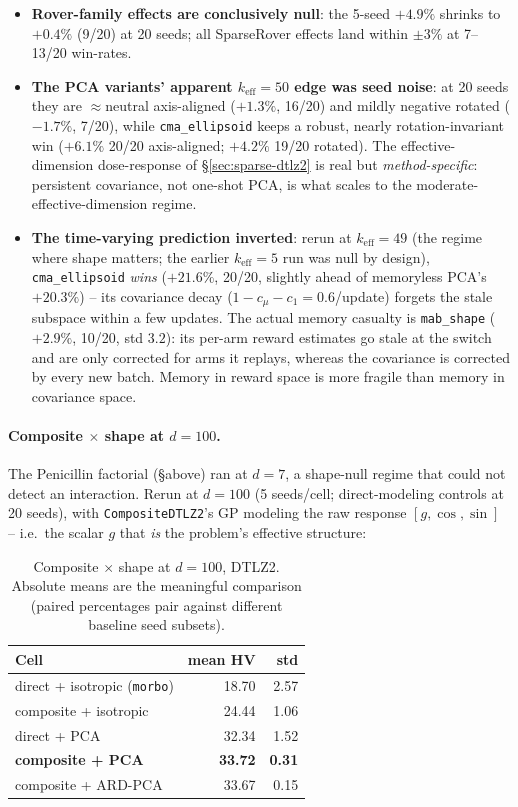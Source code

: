 \documentclass[11pt]{article}
\begin{document}
\begin{itemize}
\item \textbf{Rover-family effects are conclusively null}: the 5-seed
$+4.9\%$ shrinks to $+0.4\%$ (9/20) at 20 seeds; all SparseRover effects
land within $\pm 3\%$ at 7--13/20 win-rates.
\item \textbf{The PCA variants' apparent $k_{\mathrm{eff}}{=}50$ edge was
seed noise}: at 20 seeds they are $\approx$neutral axis-aligned ($+1.3\%$,
16/20) and mildly negative rotated ($-1.7\%$, 7/20), while
\texttt{cma\_ellipsoid} keeps a robust, nearly rotation-invariant win
($+6.1\%$ 20/20 axis-aligned; $+4.2\%$ 19/20 rotated). The
effective-dimension dose-response of \S\ref{sec:sparse-dtlz2} is real but
\emph{method-specific}: persistent covariance, not one-shot PCA, is what
scales to the moderate-effective-dimension regime.
\item \textbf{The time-varying prediction inverted}: rerun at
$k_{\mathrm{eff}}{=}49$ (the regime where shape matters; the earlier
$k_{\mathrm{eff}}{=}5$ run was null by design), \texttt{cma\_ellipsoid}
\emph{wins} ($+21.6\%$, 20/20, slightly ahead of memoryless PCA's
$+20.3\%$) -- its covariance decay ($1{-}c_\mu{-}c_1 = 0.6$/update)
forgets the stale subspace within a few updates. The actual memory
casualty is \texttt{mab\_shape} ($+2.9\%$, 10/20, std $3.2$): its per-arm
reward estimates go stale at the switch and are only corrected for arms it
replays, whereas the covariance is corrected by every new batch. Memory in
reward space is more fragile than memory in covariance space.
\end{itemize}

\paragraph{Composite $\times$ shape at $d{=}100$.} The Penicillin
factorial (\S above) ran at $d{=}7$, a shape-null regime that could not
detect an interaction. Rerun at $d{=}100$ (5 seeds/cell; direct-modeling
controls at 20 seeds), with \texttt{CompositeDTLZ2}'s GP modeling the raw
response $[g, \cos, \sin]$ -- i.e.\ the scalar $g$ that \emph{is} the
problem's effective structure:

\begin{table}[h]
\centering
\caption{Composite $\times$ shape at $d{=}100$, DTLZ2. Absolute means are
the meaningful comparison (paired percentages pair against different
baseline seed subsets).}
\label{tab:composite-shape-100d}
\begin{tabular}{lrr}
\toprule
Cell & mean HV & std \\
\midrule
direct + isotropic (\texttt{morbo}) & 18.70 & 2.57 \\
composite + isotropic & 24.44 & 1.06 \\
direct + PCA & 32.34 & 1.52 \\
\textbf{composite + PCA} & \textbf{33.72} & \textbf{0.31} \\
composite + ARD-PCA & 33.67 & 0.15 \\
\bottomrule
\end{tabular}
\end{table}
\end{document}
